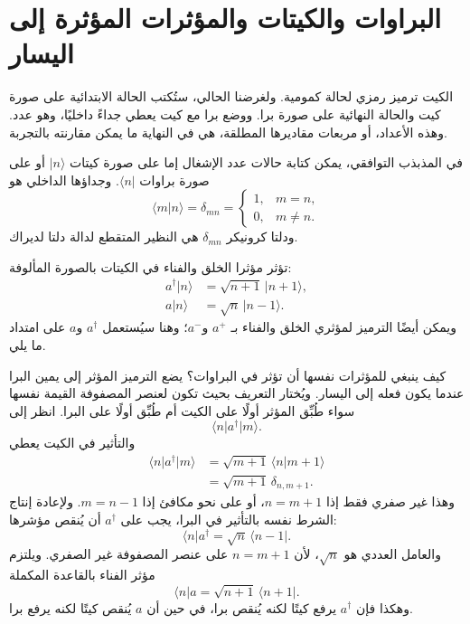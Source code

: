 \section{البراوات والكيتات والمؤثرات المؤثرة إلى اليسار}

الكيت ترميز رمزي لحالة كمومية. ولغرضنا الحالي، ستُكتب الحالة الابتدائية على صورة كيت والحالة النهائية على صورة برا. ووضع برا مع كيت يعطي جداءً داخليًا، وهو عدد. وهذه الأعداد، أو مربعات مقاديرها المطلقة، هي في النهاية ما يمكن مقارنته بالتجربة.

\begin{classroomqa}
\end{classroomqa}

في المذبذب التوافقي، يمكن كتابة حالات عدد الإشغال إما على صورة كيتات \(\lvert n\rangle\) أو على صورة براوات \(\langle n\rvert\). وجداؤها الداخلي هو
\begin{equation}
\langle m\vert n\rangle=\delta_{mn}
=\begin{cases}
1,&m=n,\\
0,&m\neq n.
\end{cases}
\end{equation}
ودلتا كرونيكر \(\delta_{mn}\) هي النظير المتقطع لدالة دلتا لديراك.

تؤثر مؤثرا الخلق والفناء في الكيتات بالصورة المألوفة:
\begin{align}
a^\dagger\lvert n\rangle&=\sqrt{n+1}\,\lvert n+1\rangle,\\
a\lvert n\rangle&=\sqrt n\,\lvert n-1\rangle.
\end{align}
ويمكن أيضًا الترميز لمؤثري الخلق والفناء بـ \(a^+\) و\(a^-\)؛ وهنا سيُستعمل \(a^\dagger\) و\(a\) على امتداد ما يلي.

كيف ينبغي للمؤثرات نفسها أن تؤثر في البراوات؟ يضع الترميز المؤثر إلى يمين البرا عندما يكون فعله إلى اليسار. ويُختار التعريف بحيث تكون لعنصر المصفوفة القيمة نفسها سواء طُبِّق المؤثر أولًا على الكيت أم طُبِّق أولًا على البرا. انظر إلى
\begin{equation}
\langle n\rvert a^\dagger\lvert m\rangle.
\end{equation}
والتأثير في الكيت يعطي
\begin{align}
\langle n\rvert a^\dagger\lvert m\rangle
&=\sqrt{m+1}\,\langle n\vert m+1\rangle\\
&=\sqrt{m+1}\,\delta_{n,m+1}.
\end{align}
وهذا غير صفري فقط إذا \(n=m+1\)، أو على نحو مكافئ إذا \(m=n-1\). ولإعادة إنتاج الشرط نفسه بالتأثير في البرا، يجب على \(a^\dagger\) أن يُنقص مؤشرها:
\begin{equation}
\langle n\rvert a^\dagger
=\sqrt n\,\langle n-1\rvert.
\end{equation}
والعامل العددي هو \(\sqrt n\)، لأن \(n=m+1\) على عنصر المصفوفة غير الصفري. ويلتزم مؤثر الفناء بالقاعدة المكملة
\begin{equation}
\langle n\rvert a
=\sqrt{n+1}\,\langle n+1\rvert.
\end{equation}
وهكذا فإن \(a^\dagger\) يرفع كيتًا لكنه يُنقص برا، في حين أن \(a\) يُنقص كيتًا لكنه يرفع برا.

